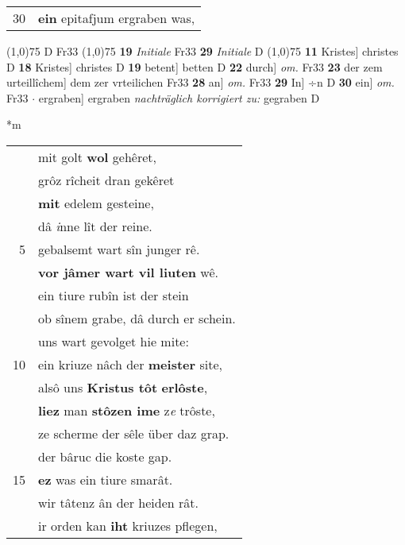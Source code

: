 \documentclass[8pt,a4paper,notitlepage]{article}
\begin{document}
\begin{table}[ht]
\begin{minipage}[t]{0.5\linewidth}
\begin{tabular}{rl}
30 & \textbf{ein} epitafjum ergraben was,\\ 
\end{tabular}
\scriptsize
\line(1,0){75} \newline
D Fr33 \newline
\line(1,0){75} \newline
\textbf{19} \textit{Initiale} Fr33  \textbf{29} \textit{Initiale} D  \newline
\line(1,0){75} \newline
\textbf{11} Kristes] christes D \textbf{18} Kristes] christes D \textbf{19} betent] betten D \textbf{22} durch] \textit{om.} Fr33 \textbf{23} der zem urteillîchem] dem zer vrteilichen Fr33 \textbf{28} an] \textit{om.} Fr33 \textbf{29} In] ÷n D \textbf{30} ein] \textit{om.} Fr33  $\cdot$ ergraben] ergraben \textit{nachträglich korrigiert zu:} gegraben D \newline
\end{minipage}
\hspace{0.5cm}
\begin{minipage}[t]{0.5\linewidth}
\small
\begin{center}*m
\end{center}
\begin{tabular}{rl}
 & mit golt \textbf{wol} gehêret,\\ 
 & grôz rîcheit dran gekêret\\ 
 & \textbf{mit} edelem gesteine,\\ 
 & dâ \textit{i}nne lît der reine.\\ 
5 & gebalsemt wart sîn junger rê.\\ 
 & \textbf{vor jâmer wart vil liuten} wê.\\ 
 & ein tiure rubîn ist der stein\\ 
 & ob sînem grabe, dâ durch er schein.\\ 
 & uns wart gevolget hie mite:\\ 
10 & ein kriuze nâch der \textbf{meister} site,\\ 
 & alsô uns \textbf{Kristus tôt} \textbf{erlôste},\\ 
 & \textbf{liez} man \textbf{stôzen ime} z\textit{e} trôste,\\ 
 & ze scherme der sêle über daz grap.\\ 
 & der bâruc die koste gap.\\ 
15 & \textbf{ez} was ein tiure smarât.\\ 
 & wir tâtenz ân der heiden rât.\\ 
 & ir orden kan \textbf{iht} kriuzes pflegen,\\ 

\end{tabular}
\end{minipage}
\end{table}
\end{document}
